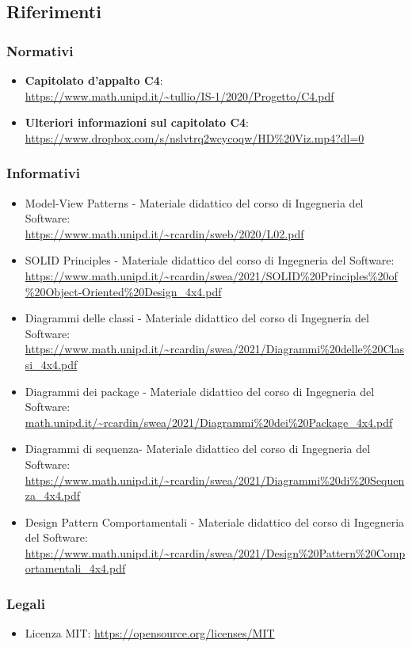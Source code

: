 \documentclass[../manuale_sviluppatore.tex]{subfiles}
\begin{document}
\subsection{Riferimenti}
\label{sub:rif}
\subsubsection{Normativi}
\begin{itemize}
    \item \textbf{Capitolato d'appalto \textsc{C4}}: \\
    \url{https://www.math.unipd.it/~tullio/IS-1/2020/Progetto/C4.pdf}
    \item \textbf{Ulteriori informazioni sul capitolato C4}: \\
    \url{https://www.dropbox.com/s/nslvtrq2wcycoqw/HD\%20Viz.mp4?dl=0}
\end{itemize}

\subsubsection{Informativi}
\begin{itemize}
    \item Model-View Patterns - Materiale didattico del corso di Ingegneria del Software: \\
        \url{https://www.math.unipd.it/~rcardin/sweb/2020/L02.pdf}
    \item SOLID Principles - Materiale didattico del corso di Ingegneria del Software: \\
        \url{https://www.math.unipd.it/~rcardin/swea/2021/SOLID%20Principles%20of%20Object-Oriented%20Design_4x4.pdf}
    \item Diagrammi delle classi - Materiale didattico del corso di Ingegneria del Software: \\
        \url{https://www.math.unipd.it/~rcardin/swea/2021/Diagrammi%20delle%20Classi_4x4.pdf}
    \item Diagrammi dei package - Materiale didattico del corso di Ingegneria del Software: \\
        \url{math.unipd.it/~rcardin/swea/2021/Diagrammi%20dei%20Package_4x4.pdf}
    \item Diagrammi di sequenza- Materiale didattico del corso di Ingegneria del Software: \\
        \url{https://www.math.unipd.it/~rcardin/swea/2021/Diagrammi%20di%20Sequenza_4x4.pdf}
    \item Design Pattern Comportamentali - Materiale didattico del corso di Ingegneria del Software: \\
        \url{https://www.math.unipd.it/~rcardin/swea/2021/Design%20Pattern%20Comportamentali_4x4.pdf}
\end{itemize}

\subsubsection{Legali}
\begin{itemize}
    \item Licenza MIT: \url{https://opensource.org/licenses/MIT}
\end{itemize}
\end{document}
